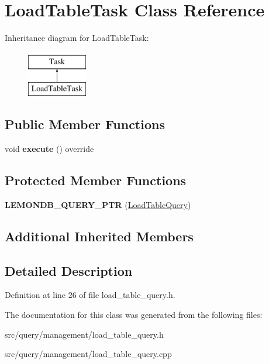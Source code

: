 \hypertarget{class_load_table_task}{}\section{Load\+Table\+Task Class Reference}
\label{class_load_table_task}
Inheritance diagram for Load\+Table\+Task\+:\begin{figure}[H]
\begin{center}
\leavevmode
\includegraphics[height=2.000000cm]{class_load_table_task}
\end{center}
\end{figure}
\subsection*{Public Member Functions}
\begin{DoxyCompactItemize}
\item 
\mbox{\label{class_load_table_task_ae0516f85ef2c1d2b1f8a2fca17dc1e45}} 
void {\bfseries execute} () override
\end{DoxyCompactItemize}
\subsection*{Protected Member Functions}
\begin{DoxyCompactItemize}
\item 
\mbox{\label{class_load_table_task_aa336ffb4e6d23238579a27c993e33263}} 
{\bfseries L\+E\+M\+O\+N\+D\+B\+\_\+\+Q\+U\+E\+R\+Y\+\_\+\+P\+TR} (\hyperlink{class_load_table_query}{Load\+Table\+Query})
\end{DoxyCompactItemize}
\subsection*{Additional Inherited Members}


\subsection{Detailed Description}


Definition at line 26 of file load\+\_\+table\+\_\+query.\+h.



The documentation for this class was generated from the following files\+:\begin{DoxyCompactItemize}
\item 
src/query/management/load\+\_\+table\+\_\+query.\+h\item 
src/query/management/load\+\_\+table\+\_\+query.\+cpp\end{DoxyCompactItemize}
